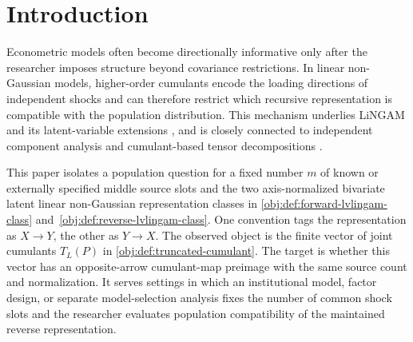 \begin{abstract}
We study a population identification question for a bivariate latent linear non-Gaussian model in which the number \(m\) of middle source slots and an axis normalization are maintained inputs. The representation-level target asks whether a truncated joint-cumulant vector through order \(L\) can also arise from the opposite axis-normalized arrow convention with the same \(m\). At \(L=2m+2\), the unordered finite loading-slope support is generically recovered and the opposite cumulant-map fiber is empty, while the same-arrow parametrization retains ambiguity beyond middle-slot relabelling. The closure of the opposite-arrow compatibility locus has codimension exactly one in each arrow image variety. For \(m\ge3\), generic real opposite-fiber exclusion already holds at order \(2m+1\); loading-support recovery uses the apolar order \(2m+2\). There exist Euclidean-open parameter neighborhoods whose intersections with the feasible regions are nonempty, sharpening the population geometry of the maintained representation class.
\end{abstract}

\section{Introduction}

Econometric models often become directionally informative only after the researcher imposes structure beyond covariance restrictions. In linear non-Gaussian models, higher-order cumulants encode the loading directions of independent shocks and can therefore restrict which recursive representation is compatible with the population distribution. This mechanism underlies LiNGAM and its latent-variable extensions \citep{ShimizuHyvarinenKanoHoyer2006,HoyerShimizuKerminenPalviainen2008,TashiroShimizuHyvarinenWashio2014,MaedaShimizu2020}, and is closely connected to independent component analysis and cumulant-based tensor decompositions \citep{Comon1994,HyvarinenOja2000,Cardoso1999,KoldaBader2009}.

This paper isolates a population question for a fixed number \(m\) of known or externally specified middle source slots and the two axis-normalized bivariate latent linear non-Gaussian representation classes in \cref{obj:def:forward-lvlingam-class} and~\cref{obj:def:reverse-lvlingam-class}. One convention tags the representation as \(X\to Y\), the other as \(Y\to X\). The observed object is the finite vector of joint cumulants \(T_L(P)\) in \cref{obj:def:truncated-cumulant}. The target is whether this vector has an opposite-arrow cumulant-map preimage with the same source count and normalization. It serves settings in which an institutional model, factor design, or separate model-selection analysis fixes the number of common shock slots and the researcher evaluates population compatibility of the maintained reverse representation.

